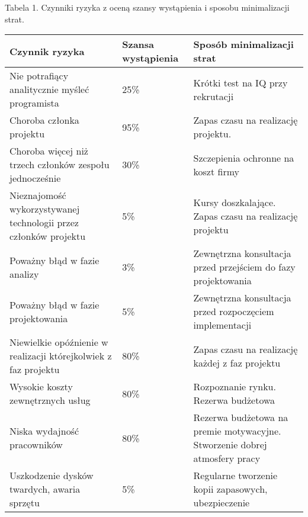 \documentclass[11pt,leqno]{article}
\begin{document}
\vspace{1 cm}
\hspace{-1.5cm}
{\small Tabela 1. Czynniki ryzyka z oceną szansy wystąpienia i sposobu minimalizacji strat.}
 \begin{tabular}{|p{6cm}|p{1.3cm}|p{6cm}|}
  \hline
 Czynnik ryzyka & Szansa wystąpienia & Sposób minimalizacji strat \\ \hline
  Nie potrafiący analitycznie myśleć programista & 25\% & Krótki test na IQ przy rekrutacji \\ \hline
 Choroba członka projektu & 95\% & Zapas czasu na realizację projektu. \\ \hline
 Choroba więcej niż trzech członków zespołu jednocześnie & 30\% & Szczepienia ochronne na koszt firmy \\ \hline
 Nieznajomość wykorzystywanej technologii przez członków  projektu & 5\% & Kursy doszkalające. Zapas czasu na realizację projektu \\ \hline
Poważny błąd w fazie analizy & 3\% & Zewnętrzna konsultacja przed przejściem do fazy projektowania \\ \hline
Poważny błąd w fazie projektowania & 5\% & Zewnętrzna konsultacja przed rozpoczęciem implementacji \\ \hline
Niewielkie opóźnienie w realizacji którejkolwiek z faz projektu & 80\% & Zapas czasu na realizację każdej z faz projektu \\ \hline
Wysokie koszty zewnętrznych usług & 80\% & Rozpoznanie rynku. Rezerwa budżetowa \\ \hline
Niska wydajność pracowników & 80\% & Rezerwa budżetowa na premie motywacyjne. Stworzenie dobrej atmosfery pracy \\ \hline
Uszkodzenie dysków twardych, awaria sprzętu & 5\% & Regularne tworzenie kopii zapasowych, ubezpieczenie \\ \hline
 \end{tabular}
\end{document}
